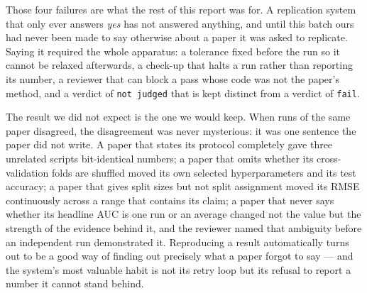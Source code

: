 \documentclass[10pt,twocolumn]{article}
\begin{document}
Those four failures are what the rest of this report was for. A replication system that only ever
answers \emph{yes} has not answered anything, and until this batch ours had never been made to
say otherwise about a paper it was asked to replicate. Saying it required the whole apparatus: a
tolerance fixed before the run so it cannot be relaxed afterwards, a check-up that halts a run
rather than reporting its number, a reviewer that can block a pass whose code was not the paper's
method, and a verdict of \texttt{not judged} that is kept distinct from a verdict of
\texttt{fail}.

The result we did not expect is the one we would keep. When runs of the same paper disagreed, the
disagreement was never mysterious: it was one sentence the paper did not write. A paper that
states its protocol completely gave three unrelated scripts bit-identical numbers; a paper that
omits whether its cross-validation folds are shuffled moved its own selected hyperparameters and
its test accuracy; a paper that gives split sizes but not split assignment moved its RMSE
continuously across a range that contains its claim; a paper that never says whether its headline
AUC is one run or an average changed not the value but the strength of the evidence behind it, and
the reviewer named that ambiguity before an independent run demonstrated it. Reproducing a result
automatically turns out to be a good way of finding out precisely what a paper forgot to say ---
and the system's most valuable habit is not its retry loop but its refusal to report a number it
cannot stand behind.
\end{document}
